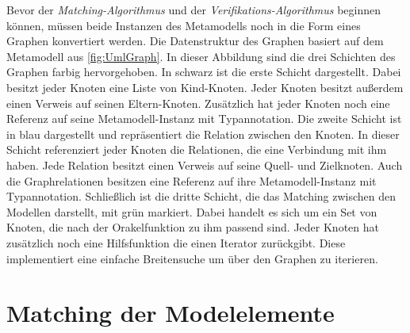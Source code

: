 Bevor der \emph{Matching-Algorithmus} und der \emph{Verifikations-Algorithmus} beginnen können, müssen beide Instanzen des Metamodells noch in die Form eines Graphen konvertiert werden.
Die Datenstruktur des Graphen basiert auf dem Metamodell aus \cref{fig:UmlGraph}.
In dieser Abbildung sind die drei Schichten des Graphen farbig hervorgehoben.
In schwarz ist die erste Schicht dargestellt.
Dabei besitzt jeder Knoten eine Liste von Kind-Knoten.
Jeder Knoten besitzt außerdem einen Verweis auf seinen Eltern-Knoten.
Zusätzlich hat jeder Knoten noch eine Referenz auf seine Metamodell-Instanz mit Typannotation.
Die zweite Schicht ist in blau dargestellt und repräsentiert die Relation zwischen den Knoten.
In dieser Schicht referenziert jeder Knoten die Relationen, die eine Verbindung mit ihm haben.
Jede Relation besitzt einen Verweis auf seine Quell- und Zielknoten.
Auch die Graphrelationen besitzen eine Referenz auf ihre Metamodell-Instanz mit Typannotation.
Schließlich ist die dritte Schicht, die das Matching zwischen den Modellen darstellt, mit grün markiert.
Dabei handelt es sich um ein Set von Knoten, die nach der Orakelfunktion zu ihm passend sind.
Jeder Knoten hat zusätzlich noch eine Hilfsfunktion die einen Iterator zurückgibt.
Diese implementiert eine einfache Breitensuche um über den Graphen zu iterieren.

\section{Matching der Modelelemente}
\label{sec:matching_model_elements}

